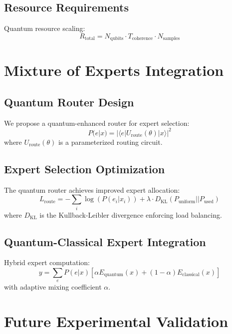 \documentclass{article}
\begin{document}
\subsection{Resource Requirements}
Quantum resource scaling:
\begin{equation}
R_{\text{total}} = N_{\text{qubits}} \cdot T_{\text{coherence}} \cdot N_{\text{samples}}
\end{equation}

\section{Mixture of Experts Integration}

\subsection{Quantum Router Design}
We propose a quantum-enhanced router for expert selection:
\begin{equation}
P(e|x) = |\langle e|U_{\text{route}}(\theta)|x\rangle|^2
\end{equation}
where $U_{\text{route}}(\theta)$ is a parameterized routing circuit.

\subsection{Expert Selection Optimization}
The quantum router achieves improved expert allocation:
\begin{equation}
L_{\text{route}} = -\sum_i \log(P(e_i|x_i)) + \lambda \cdot D_{\text{KL}}(P_{\text{uniform}}||P_{\text{used}})
\end{equation}
where $D_{\text{KL}}$ is the Kullback-Leibler divergence enforcing load balancing.

\subsection{Quantum-Classical Expert Integration}
Hybrid expert computation:
\begin{equation}
y = \sum_e P(e|x)[\alpha E_{\text{quantum}}(x) + (1-\alpha)E_{\text{classical}}(x)]
\end{equation}
with adaptive mixing coefficient $\alpha$.

\section{Future Experimental Validation}
\end{document}
